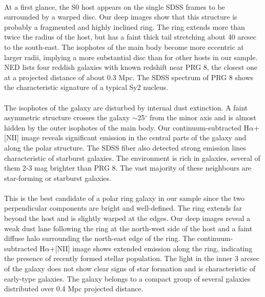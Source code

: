 \documentclass[useAMS,usenatbib]{mn2e}
\begin{document}
 \\
At a first glance, the S0 host appears on the single SDSS frames to be surrounded by a warped disc. Our deep images show  
that this structure is probably a fragmented and highly inclined ring. The ring extends more than 
twice the radius of the host,  but has a faint thick tail stretching about 40 arcsec to the south-east.
The isophotes of the main body become more eccentric at larger radii, implying a more substantial disc than for other hosts in our sample.
NED lists four reddish galaxies with known redshift near PRG 8, the closest one at a projected distance of about 0.3 Mpc.
The SDSS spectrum of PRG 8 shows the characteristic signature of a typical Sy2 nucleus.  \\
   
 \\
The isophotes of the galaxy are disturbed by internal dust extinction. 
A faint asymmetric structure crosses the galaxy $\sim$25$^\circ$ from the minor axis and is almost hidden by the outer isophotes of the main body. 
Our continuum-subtracted H$\alpha$+[NII] image reveals significant emission 
in the central parts of the galaxy and along the polar structure. 
The SDSS fiber also detected strong emission lines characteristic of starburst galaxies. 
The environment is rich in galaxies, several of them 2-3 mag brighter than PRG 8.
The vast majority of these neighbours are star-forming or starburst galaxies. \\
 
 \\
This is the best candidate of a polar ring galaxy in our sample since the two perpendicular components are bright and well-defined.
The ring extends far beyond the host and is slightly warped at the edges. Our deep images reveal a weak dust lane following the ring at the north-west 
side of the host and a faint diffuse halo surrounding the north-east edge of the ring. 
The continuum-subtracted H$\alpha$+[NII] image shows extended emission along the ring, indicating the presence of recently formed stellar population. 
The light in the inner 3 arcsec of the galaxy does not show clear signs of star formation and is characteristic of early-type galaxies.
The galaxy belongs to a compact group of several galaxies distributed over 0.4 Mpc projected distance. \\
\end{document}
